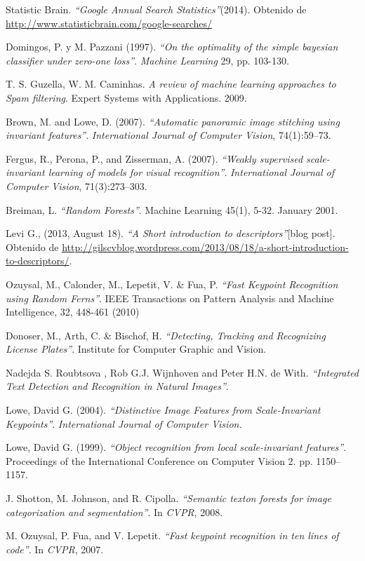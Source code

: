\begin{thebibliography}{100}
	Statistic Brain.
	\emph{``Google Annual Search Statistics''}(2014).
	Obtenido de \url{http://www.statisticbrain.com/google-searches/}
	
		Domingos, P. y M. Pazzani (1997).
		\emph{``On the optimality of the simple bayesian classifier under zero-one loss''}. \textit{Machine Learning} 29, pp. 103-130.
		
		T. S. Guzella, W. M. Caminhas.
		\emph{A review of machine learning approaches to Spam filtering}.
		Expert Systems with Applications.
		2009.
		
		Brown, M. and Lowe, D. (2007).
		\emph{``Automatic panoramic image stitching using invariant features''}.
		\textit{International Journal of Computer Vision},
		74(1):59–73.
	
		Fergus, R., Perona, P., and Zisserman, A. (2007).
		\emph{``Weakly supervised scale-invariant learning of models for visual recognition''}.
		\textit{International Journal of Computer Vision},
		71(3):273–303.
		
		Breiman, L.
		\emph{``Random Forests''}.
		Machine Learning 45(1), 5-32.
		January 2001.
		
				
		Levi G., (2013, August 18).
		\emph{``A Short introduction to descriptors''}[blog post].
		Obtenido de \url{http://gilscvblog.wordpress.com/2013/08/18/a-short-introduction-to-descriptors/}.
	
		Ozuysal, M., Calonder, M., Lepetit, V. \& Fua, P.
		\emph{``Fast Keypoint Recognition using Random Ferns''}.
		IEEE Transactions on Pattern Analysis and Machine Intelligence,
		32, 448-461 (2010)
		
		Donoser, M., Arth, C. \& Bischof, H.
		\emph{``Detecting, Tracking and Recognizing License Plates''}.
		Institute for Computer Graphic and Vision.
		
		Nadejda S. Roubtsova , Rob G.J. Wijnhoven and Peter H.N. de With.
		\emph{``Integrated Text Detection and Recognition in Natural Images''}.
		
		Lowe, David G. (2004).
		\emph{``Distinctive Image Features from Scale-Invariant Keypoints''}.
		\textit{International Journal of Computer Vision.}
		
		Lowe, David G. (1999).
		\emph{``Object recognition from local scale-invariant features''}.
		Proceedings of the International Conference on Computer Vision 2.
		pp. 1150–1157.
		
		J. Shotton, M. Johnson, and R. Cipolla.
		\emph{``Semantic texton forests for image categorization and segmentation''}.
		In \textit{CVPR}, 2008.
		
		M. Ozuysal, P. Fua, and V. Lepetit.
		\emph{``Fast keypoint recognition in ten lines of code''}.
		In \textit{CVPR}, 2007.
		

		
		
	
		
				
\end{thebibliography}